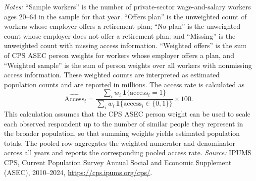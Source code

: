 \documentclass[11pt]{article}
\begin{document}
\begin{table}[H]
\vspace{0.5em}
\begin{minipage}{0.92\linewidth}
\scriptsize
\textit{Notes:} ``Sample workers'' is the number of private-sector wage-and-salary workers ages 20--64 in the sample for that year. ``Offers plan'' is the unweighted count of workers whose employer offers a retirement plan; ``No plan'' is the unweighted count whose employer does not offer a retirement plan; and ``Missing'' is the unweighted count with missing access information. ``Weighted offers'' is the sum of CPS ASEC person weights for workers whose employer offers a plan, and ``Weighted sample'' is the sum of person weights over all workers with nonmissing access information. These weighted counts are interpreted as estimated population counts and are reported in millions. The access rate is calculated as
\[
\widehat{\text{Access}}_t
=
\frac{\sum_i w_i \, \mathbf{1}\{\text{access}_i = 1\}}
{\sum_i w_i \, \mathbf{1}\{\text{access}_i \in \{0,1\}\}} \times 100.
\]
This calculation assumes that the CPS ASEC person weight can be used to scale each observed respondent up to the number of similar people they represent in the broader population, so that summing weights yields estimated population totals.
The pooled row aggregates the weighted numerator and denominator across all years and reports the corresponding pooled access rate. \textit{Source:} IPUMS CPS, Current Population Survey Annual Social and Economic Supplement (ASEC), 2010--2024, \url{https://cps.ipums.org/cps/}.
\end{minipage}
\end{table}
\end{document}
